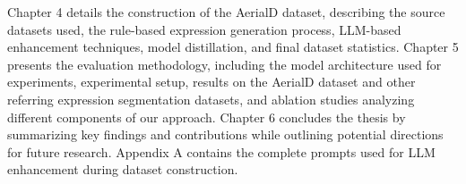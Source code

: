 Chapter 4 details the construction of the AerialD dataset, describing the source datasets used, the rule-based expression generation process, LLM-based enhancement techniques, model distillation, and final dataset statistics. Chapter 5 presents the evaluation methodology, including the model architecture used for experiments, experimental setup, results on the AerialD dataset and other referring expression segmentation datasets, and ablation studies analyzing different components of our approach. Chapter 6 concludes the thesis by summarizing key findings and contributions while outlining potential directions for future research. Appendix A contains the complete prompts used for LLM enhancement during dataset construction.